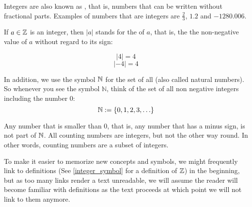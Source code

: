 Integers are also known as , that is, numbers that can be written without fractional parts. Examples of numbers that are  integers are $\frac{2}{3}$, $1.2$ and $-1280.006$.

If $a\in \mathbb{Z}$ is an integer, then $|a|$ stands for the  of $a$, that is, the the non-negative value of $a$ without regard to its sign:

\begin{equation}
|4|= 4 
\end{equation}
\begin{equation}
|-4|= 4 
\end{equation}


In addition, we use the symbol $\mathbb{N}$ for the set of all  (also called natural numbers). So whenever you see the symbol $\mathbb{N}$, think of the set of all non negative integers including the number $0$:
\begin{equation}
\label{natural_symbol}
\mathbb{N} := \{0,1,2,3,\ldots\}
\end{equation}

Any number that is smaller than 0, that is, any number that has a minus sign, is not part of $\mathbb{N}$. All counting numbers are integers, but not the other way round. In other words, counting numbers are a subset of integers.


To make it easier to memorize new concepts and symbols, we might frequently link to definitions (See \ref{integer_symbol} for a definition of $\mathbb{Z}$) in the beginning, but as too many links render a text unreadable, we will assume the reader will become familiar with definitions as the text proceeds at which point we will not link to them anymore.

